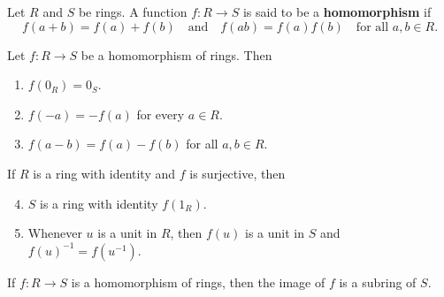 \documentclass[../main.tex]{subfiles}
\begin{document}
\begin{definition}[Homomorphism]
Let $R$ and $S$ be rings. A function $f: R \to S$ is said to be a \textbf{homomorphism} if
\[
f(a + b) = f(a) + f(b) \quad \text{and} \quad f(ab) = f(a) f(b) \quad \text{for all } a, b \in R.
\]
\end{definition}










\begin{theorem}
Let $f: R \to S$ be a homomorphism of rings. Then
\begin{enumerate}
    \item $f(0_R) = 0_S$.
    \item $f(-a) = -f(a)$ for every $a \in R$.
    \item $f(a - b) = f(a) - f(b)$ for all $a, b \in R$.
\end{enumerate}

If $R$ is a ring with identity and $f$ is surjective, then
\begin{enumerate}
    \setcounter{enumi}{3}
    \item $S$ is a ring with identity $f(1_R)$.
    \item Whenever $u$ is a unit in $R$, then $f(u)$ is a unit in $S$ and $f(u)^{-1} = f(u^{-1})$.
\end{enumerate}
\end{theorem}











\begin{corollary}
If $f: R \to S$ is a homomorphism of rings, then the image of $f$ is a subring of $S$.
\end{corollary}
\end{document}

